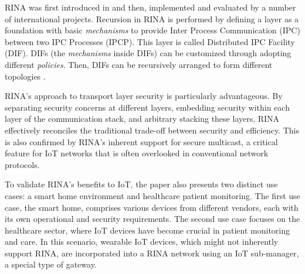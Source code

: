 \documentclass{ieeeaccess}
\begin{document}
RINA was first introduced in \cite{Day:2008:PNA} and then, implemented and evaluated by a number of international projects. Recursion in RINA is performed by defining a layer as a foundation with basic \textit{mechanisms} to provide Inter Process Communication (IPC) between two IPC Processes (IPCP). This layer is called Distributed IPC Facility (DIF). DIFs (the \textit{mechanisms} inside DIFs) can be customized through adopting different \textit{policies}. Then, DIFs can be recursively arranged to form different topologies \cite{peymanICC16}. 


RINA's approach to transport layer security is particularly advantageous. By separating security concerns at different layers, embedding security within each layer of the communication stack, and arbitrary stacking these layers, RINA effectively reconciles the traditional trade-off between security and efficiency. This is also confirmed by RINA's inherent support for secure multicast, a critical feature for IoT networks that is often overlooked in conventional network protocols.

To validate RINA's benefits to IoT, the paper also presents two distinct use cases: a smart home environment and healthcare patient monitoring. The first use case, the smart home, comprises various devices from different vendors, each with its own operational and security requirements. 
The second use case focuses on the healthcare sector, where IoT devices have become crucial in patient monitoring and care. In this scenario, wearable IoT devices, which might not inherently support RINA, are incorporated into a RINA network using an IoT sub-manager, a special type of gateway. %
\end{document}
